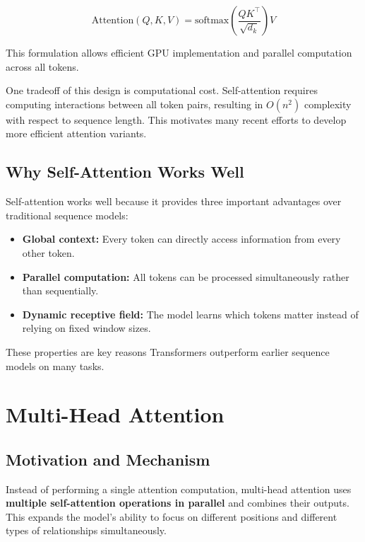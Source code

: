 \documentclass[11pt]{article}
\begin{document}
\[
\text{Attention}(Q,K,V)
=
\text{softmax}
\left(
\frac{QK^\top}{\sqrt{d_k}}
\right)V
\]

This formulation allows efficient GPU implementation and parallel computation across all tokens.

One tradeoff of this design is computational cost. Self-attention requires computing interactions between all token pairs, resulting in $O(n^2)$ complexity with respect to sequence length. This motivates many recent efforts to develop more efficient attention variants.

\subsection{Why Self-Attention Works Well}

Self-attention works well because it provides three important advantages over traditional sequence models:

\begin{itemize}

\item \textbf{Global context:}
Every token can directly access information from every other token.

\item \textbf{Parallel computation:}
All tokens can be processed simultaneously rather than sequentially.

\item \textbf{Dynamic receptive field:}
The model learns which tokens matter instead of relying on fixed window sizes.

\end{itemize}

These properties are key reasons Transformers outperform earlier sequence models on many tasks.

\section{Multi-Head Attention}

\subsection{Motivation and Mechanism}

Instead of performing a single attention computation, multi-head attention uses \textbf{multiple self-attention operations in parallel} and combines their outputs. This expands the model's ability to focus on different positions and different types of relationships simultaneously.
\end{document}
